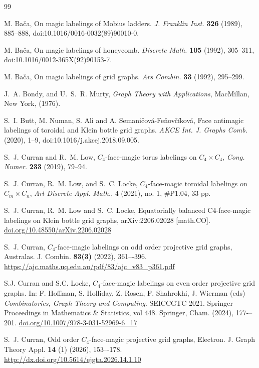 \documentclass[10pt, reqno]{amsart}
\theoremstyle{definition}
\theoremstyle{plain}
\begin{document}
\begin{thebibliography}{99}

M. Ba\v{c}a,  On magic labelings of Mobius ladders.  \textit{J. Franklin Inst.}  \textbf{326} (1989), 885--888, doi:10.1016/0016-0032(89)90010-0.

M. Ba\v{c}a,  On magic labelings of honeycomb.  \textit{Discrete Math.}  \textbf{105} (1992), 305--311, doi:10.1016/0012-365X(92)90153-7.

M. Ba\v{c}a,  On magic labelings of grid graphs.   \textit{Ars Combin.} \textbf{33} (1992), 295--299.

J.~A. Bondy, and U.~S.~R. Murty, \textit{Graph Theory with Applications}, MacMillan, New York, (1976).

S.~I. Butt, M. Numan, S. Ali and A. Semani\v{c}ov\'{a}-Fe\v{n}ov\v{c}\'{i}kov\'{a}, Face antimagic labelings of toroidal and Klein bottle grid graphs.
\textit{AKCE Int. J. Graphs Comb.} (2020), 1--9,  doi:10.1016/j.akcej.2018.09.005.

S.~J. Curran and R.~M. Low, $C_4$-face-magic torus labelings on $C_4 \times C_4$,   \textit{Cong. Numer.} \textbf{233} (2019), 79--94.

S.~J. Curran, R.~M. Low, and  S.~C. Locke,  $C_4$-face-magic toroidal labelings on $C_{m} \times C_{n}$, \textit{Art Discrete Appl. Math.}, 4 (2021), no. 1, \#P1.04, 33 pp.

S.~J. Curran, R.~M. Low and S.~C. Locke, Equatorially balanced C4-face-magic labelings on
Klein bottle grid graphs, 
arXiv:2206.02028 [math.CO]. 
\url{doi.org/10.48550/arXiv.2206.02028}

S.~J. Curran, $C_4$-face-magic labelings on odd order projective grid graphs, 
Australas. J. Combin.
\textbf{83(3)} (2022), 361–-396. 
\url{https://ajc.maths.uq.edu.au/pdf/83/ajc_v83_p361.pdf}

S.J. Curran and S.C. Locke, 
$C_4$-face-magic labelings on even order projective grid graphs.
In: F. Hoffman, S. Holliday, Z. Rosen, F. Shahrokhi, 
J. Wierman (eds) 
\textit{Combinatorics, Graph Theory and Computing}. 
SEICCGTC 2021. Springer Proceedings in Mathematics
\& Statistics, vol 448. Springer, Cham. (2024), 177-–201. 
\url{doi.org/10.1007/978-3-031-52969-6_17}

S.~J. Curran,
Odd order $C_4$-face-magic projective grid graphs,
Electron. J. Graph Theory Appl. 
\textbf{14} (1) (2026), 153–-178. 
\url{http://dx.doi.org/10.5614/ejgta.2026.14.1.10}


\end{thebibliography}
\end{document}
